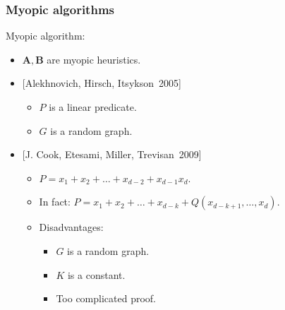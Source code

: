 \begin{frame}
    \frametitle{Myopic algorithms}

    \pause

    \begin{definition}
		Myopic algorithm:
        \begin{itemize}
	        \item $\mathbf{A}, \mathbf{B}$ are myopic heuristics.
        \end{itemize}
	\end{definition}

    \pause

    \begin{itemize}
    	\item{} [Alekhnovich, Hirsch, Itsykson~2005]
            \begin{itemize}
	            \item $P$ is a linear predicate.
            	\item $G$ is a random graph.
            \end{itemize}
        \pause
        \item{} [J. Cook, Etesami, Miller, Trevisan~2009] 
            \begin{itemize}
                \pause
   	            \item $P = x_1 + x_2 + \dots + x_{d - 2} + x_{d - 1}x_{d}$.
	            \item In fact: $P = x_1 + x_2 + \dots + x_{d - k} +
            		Q(x_{d - k + 1}, \dots, x_d)$.
                \pause
                \item Disadvantages:
            		\pause
		            \begin{itemize}
   	            		\item $G$ is a random graph.
		            	\pause
        		    	\item $K$ is a constant.
            			\pause
		            	\item Too complicated proof.            
		            \end{itemize}
            \end{itemize}
    \end{itemize}
\end{frame}



